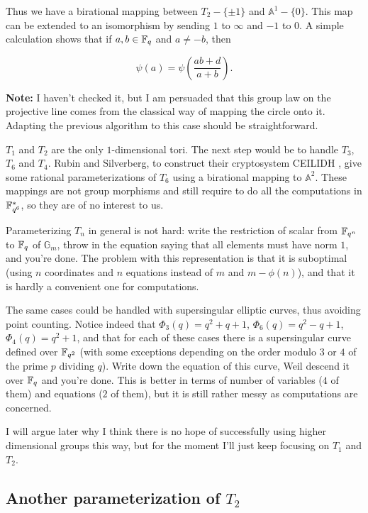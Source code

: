 \documentclass[11pt]{article}
\begin{document}
Thus we have a birational mapping between $T_2 - \{\pm 1\}$ and
$\mathbb{A}^1 - \{0\}$. This map can be extended to an isomorphism by
sending $1$ to $\infty$ and $-1$ to $0$. A simple calculation shows
that if $a,b\in\mathbb{F}_q$ and $a\ne -b$, then
    
\begin{equation}
  \psi(a) = \psi\left(\frac{ab+d}{a+b}\right).
\end{equation}

\textbf{Note:} I haven't checked it, but I am persuaded that this
group law on the projective line comes from the classical way of
mapping the circle onto it. Adapting the previous algorithm to this
case should be straightforward.

$T_1$ and $T_2$ are the only $1$-dimensional tori. The next step would
be to handle $T_3$, $T_6$ and $T_4$. Rubin and Silverberg, to
construct their cryptosystem CEILIDH \cite{rubin-silverberg+crypto03},
give some rational parameterizations of $T_6$ using a birational
mapping to $\mathbb{A}^2$. These mappings are not group morphisms and
still require to do all the computations in $\mathbb{F}_{q^6}^\ast$, so they
are of no interest to us.

Parameterizing $T_n$ in general is not hard: write the restriction of
scalar from $\mathbb{F}_{q^n}$ to $\mathbb{F}_q$ of $\mathbb{G}_m$, throw in the
equation saying that all elements must have norm $1$, and you're
done. The problem with this representation is that it is suboptimal
(using $n$ coordinates and $n$ equations instead of $m$ and
$m-\phi(n)$), and that it is hardly a convenient one for computations.

The same cases could be handled with supersingular elliptic curves,
thus avoiding point counting. Notice indeed that $\Phi_3(q)=q^2+q+1$,
$\Phi_6(q)=q^2-q+1$, $\Phi_4(q)=q^2+1$, and that for each of these
cases there is a supersingular curve defined over $\mathbb{F}_{q^2}$ (with
some exceptions depending on the order modulo $3$ or $4$ of the prime
$p$ dividing $q$). Write down the equation of this curve, Weil descend
it over $\mathbb{F}_q$ and you're done. This is better in terms of number of
variables ($4$ of them) and equations ($2$ of them), but it is still
rather messy as computations are concerned.

I will argue later why I think there is no hope of successfully using
higher dimensional groups this way, but for the moment I'll just keep
focusing on $T_1$ and $T_2$.

\subsection{Another parameterization of $T_2$}
    
\end{document}
